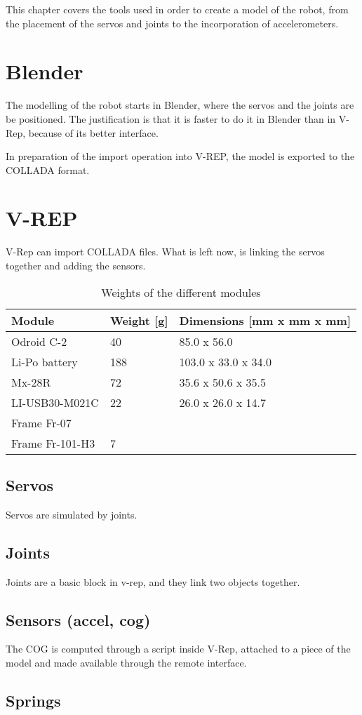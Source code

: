 This chapter covers the tools used in order to create a model of the robot, from the placement of the servos and joints to the incorporation of accelerometers.

\section{Blender}
The modelling of the robot starts in Blender, where the servos and the joints are be positioned. The justification is that it is faster to do it in Blender than in V-Rep, because of its better interface. 

In preparation of the import operation into V-REP, the model is exported to the COLLADA format.

\section{V-REP}
V-Rep can import COLLADA files. What is left now, is linking the servos together and adding the sensors.

\begin{table}[htp]
\center
\begin{tabularx}{\textwidth}{@{} X X l @{}}
\toprule
\textbf{Module} & \textbf{Weight [g]} & \textbf{Dimensions [mm x mm x mm]}\\ 
\midrule
Odroid C-2 & 40 & 85.0 x 56.0\\
Li-Po battery & 188 & 103.0 x 33.0 x 34.0\\
Mx-28R & 72 & 35.6 x 50.6 x 35.5\\
LI-USB30-M021C & 22 & 26.0 x 26.0 x 14.7\\
Frame Fr-07 & & \\
Frame Fr-101-H3 & 7 & \\
\bottomrule
\end{tabularx}
\caption{Weights of the different modules}
\label{table:specs}
\end{table}

\subsection{Servos}
Servos are simulated by joints.

\subsection{Joints}
Joints are a basic block in v-rep, and they link two objects together. 

\subsection{Sensors (accel, cog)}
The COG is computed through a script inside V-Rep, attached to a piece of the model and made available through the remote interface.

\subsection{Springs}